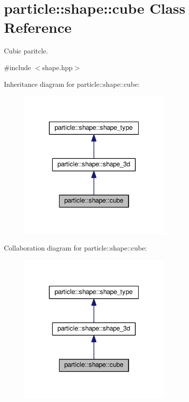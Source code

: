 \hypertarget{classparticle_1_1shape_1_1cube}{}\section{particle\+:\+:shape\+:\+:cube Class Reference}
\label{classparticle_1_1shape_1_1cube}


Cubic paritcle.  




{\ttfamily \#include $<$shape.\+hpp$>$}



Inheritance diagram for particle\+:\+:shape\+:\+:cube\+:\nopagebreak
\begin{figure}[H]
\begin{center}
\leavevmode
\includegraphics[width=217pt]{d6/dc4/classparticle_1_1shape_1_1cube__inherit__graph}
\end{center}
\end{figure}


Collaboration diagram for particle\+:\+:shape\+:\+:cube\+:
\nopagebreak
\begin{figure}[H]
\begin{center}
\leavevmode
\includegraphics[width=217pt]{d9/d6b/classparticle_1_1shape_1_1cube__coll__graph}
\end{center}
\end{figure}
